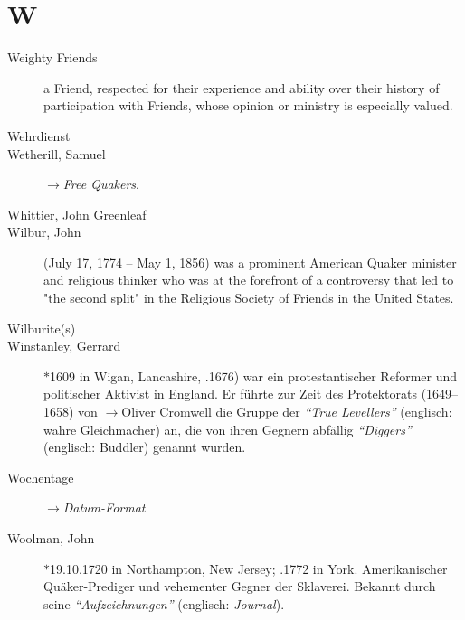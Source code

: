 \section*{W}

\articlesize

\begin{description}
 \item[Weighty Friends]
    a Friend, respected for their experience and ability over their history of participation with Friends, whose opinion or ministry is especially valued.

 
 \item[Wehrdienst]

 \item[Wetherill, Samuel] $\to$\textit{Free Quakers}.

 \item[Whittier, John Greenleaf]

 \item[Wilbur, John] (July 17, 1774 – May 1, 1856) was a prominent American Quaker minister and religious thinker who was at the forefront of a controversy that led to "the second split" in the Religious Society of Friends in the United States.

 \item[Wilburite(s)]

 \item[Winstanley, Gerrard] $\ast$1609 in Wigan, Lancashire, .1676) war ein protestantischer Reformer und politischer Aktivist in England. Er führte zur Zeit des Protektorats (1649–1658) von $\to$Oliver Cromwell die Gruppe der \textit{"`True Levellers"'} (englisch: wahre Gleichmacher) an, die von ihren Gegnern abfällig \textit{"`Diggers"'} (englisch: Buddler) genannt wurden.

\item[Wochentage] $\to$\textit{Datum-Format}

\item[Woolman, John] $\ast$19.10.1720 in Northampton, New Jersey; .1772 in York. Amerikanischer Quäker-Prediger und vehementer Gegner der Sklaverei. Bekannt durch seine \textit{"`Aufzeichnungen"'} (englisch: \textit{Journal}).

 \end{description}


\normalsize